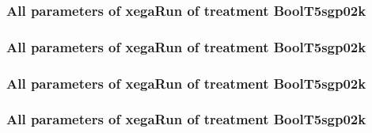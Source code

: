 \documentclass[18pt,c]{beamer}
\begin{document}

 \begin{frame}
 \fontsize{8pt}{9pt}\selectfont
 \frametitle{  All parameters of xegaRun of treatment BoolT5sgp02k 
 }

 \label{ExpFtParmTable046.tex}  
 \end{frame}


 \begin{frame}
 \fontsize{8pt}{9pt}\selectfont
 \frametitle{  All parameters of xegaRun of treatment BoolT5sgp02k 
 }

 \label{ExpFtParmTable047.tex}  
 \end{frame}


 \begin{frame}
 \fontsize{8pt}{9pt}\selectfont
 \frametitle{  All parameters of xegaRun of treatment BoolT5sgp02k 
 }

 \label{ExpFtParmTable048.tex}  
 \end{frame}


 \begin{frame}
 \fontsize{8pt}{9pt}\selectfont
 \frametitle{  All parameters of xegaRun of treatment BoolT5sgp02k 
 }

 \label{ExpFtParmTable049.tex}  
 \end{frame}

\end{document}
